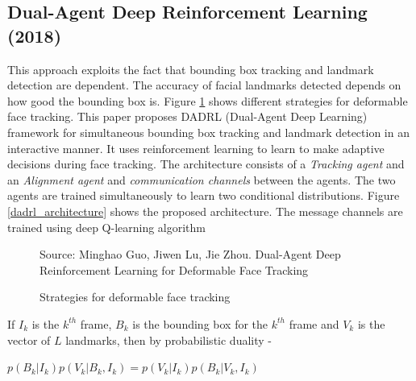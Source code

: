 \documentclass{llncs}
\begin{document}
\subsection{Dual-Agent Deep Reinforcement Learning (2018) \cite{dadrl}}

This approach exploits the fact that bounding box tracking and landmark detection are dependent. The accuracy of facial landmarks detected depends on how good the bounding box is.
Figure \ref{deformable_face_tracking} shows different strategies for deformable face tracking. This paper proposes DADRL (Dual-Agent Deep Learning) framework for simultaneous bounding box tracking and landmark detection in an interactive manner. It uses reinforcement learning to learn to make adaptive decisions during face tracking. The architecture consists of a \textit{Tracking agent} and an \textit{Alignment agent} and \textit{communication channels} between the agents. The two agents are trained simultaneously to learn two conditional distributions. Figure \ref{dadrl_architecture} shows the proposed architecture. The message channels are trained using deep Q-learning algorithm\\

\begin{figure}
%
{Source: Minghao Guo, Jiwen Lu, Jie Zhou. Dual-Agent Deep Reinforcement Learning for Deformable Face Tracking}
\caption{Strategies for deformable face tracking}
\label{deformable_face_tracking}
\end{figure}

If $I_k$ is the $k^{th}$ frame, $B_k$ is the bounding box for the $k^{th}$ frame and $V_k$ is the vector of $L$ landmarks, then by probabilistic duality -  

$p\left(B_{k} | I_{k}\right) p\left(V_{k} | B_{k}, I_{k}\right)=p\left(V_{k} | I_{k}\right) p\left(B_{k} | V_{k}, I_{k}\right)$\\
\end{document}
